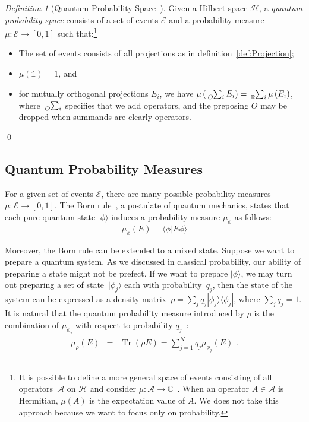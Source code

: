 \documentclass{article}
\theoremstyle{remark}
\newtheorem{definition}{Definition}
\newcommand{\events}{\ensuremath{\mathcal{E}}}
\newcommand{\Hilb}{\mathcal{H}}
\newcommand{\ket}[1]{|#1\rangle}
\newcommand{\ip}[2]{\langle #1 | #2 \rangle}
\newcommand{\proj}[1]{|#1 \rangle\langle #1 |}
\def\C{{\mathbb{C}}}
\newcommand{\Tr}{\mathop{\mathrm{Tr}}\nolimits}
\begin{document}
\begin{definition}[Quantum Probability Space~\cite{10.2307/2308516,gleason1957,Redhead1987-REDINA,Maassen2010}]
  Given a Hilbert space $\Hilb$, a \emph{quantum probability space}
  consists of a set of events $\events$ and a probability measure
  $\mu : \events \rightarrow [0,1]$ such that:\footnote {It is
    possible to define a more general space of events consisting of
    all operators~$\mathcal{A}$ on $\Hilb$ and consider
    $\mu:\mathcal{A}\rightarrow\C$~\cite{Maassen2010,Swart2013}.  When
    an operator $A\in\mathcal{A}$ is Hermitian, $\mu\left(A\right)$ is
    the expectation value of $A$. We does not take this approach
    because we want to focus only on probability. }
\begin{itemize}
\item The set of events consists of all projections as in
  definition~\ref{def:Projection};
\item $\mu(\mathbb{1})=1$, and 
\item for mutually orthogonal projections $E_{i}$, we have $\mu\left(\tensor*[_{O}]{\sum}{_{i}}E_{i}\right)=\tensor*[_{\mathbb{R}}]{\sum}{_{i}}\mu\left(E_{i}\right)$,
where $\tensor*[_{O}]{\sum}{_{i}}$ specifies that we add operators,
and the preposing $O$ may be dropped when summands are clearly operators.
\end{itemize}
\qed\end{definition}

\subsection{Quantum Probability Measures}

For a given set of events $\events$, there are many possible probability
measures $\mu:\events\rightarrow[0,1]$. The Born rule~\cite{Born1984,Mermin2007,RiederSvozil2007},
a postulate of quantum mechanics, states that each pure quantum state
$\ket{\phi}$ induces a probability measure $\mu_{\phi}$ as follows:
\[
\mu_{\phi}(E)=\ip{\phi}{E\phi}
\]

Moreover, the Born rule can be extended to a mixed state. Suppose
we want to prepare a quantum system. As we discussed in classical
probability, our ability of preparing a state might not be prefect.
If we want to prepare $\ket{\phi}$, we may turn out preparing a set
of state~$\ket{\phi_{j}}$ each with probability~$q_{j}$, then
the state of the system can be expressed as a density matrix~$\rho=\sum_{j}q_{j}\proj{\phi_{j}}$,
where $\sum_{j}q_{j}=1$. It is natural that the quantum probability
measure introduced by $\rho$ is the combination of $\mu_{\phi_{j}}$
with respect to probability $q_{j}$~\cite{peres1995quantum,544199,RiederSvozil2007}:
\begin{eqnarray}
\mu_{\rho}\left(E\right) & = & \Tr\left(\rho E\right)=\sum_{j=1}^{N}q_{j}\mu_{\phi_{j}}\left(E\right)\textrm{ .}\label{BornRule.mixed}
\end{eqnarray}
\end{document}
